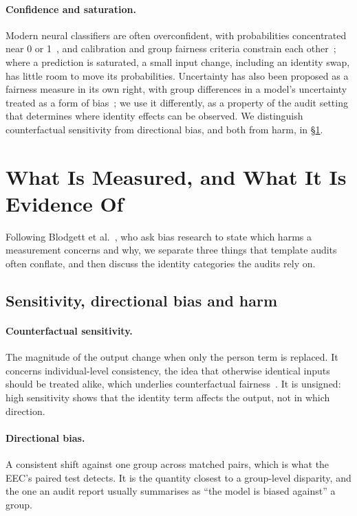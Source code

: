 \documentclass[runningheads]{llncs}
\begin{document}
\paragraph{Confidence and saturation.}
Modern neural classifiers are often overconfident, with probabilities
concentrated near 0 or 1~\cite{guo2017}, and calibration and group fairness
criteria constrain each other~\cite{pleiss2017}; where a prediction is saturated, a
small input change, including an identity swap, has little room to move its
probabilities. Uncertainty has also been proposed as a fairness measure in its
own right, with group differences in a model's uncertainty treated as a form of
bias~\cite{kuzucu2024}; we use it differently, as a property of the audit
setting that determines where identity effects can be observed. We
distinguish counterfactual sensitivity from directional bias, and both from
harm, in \S\ref{sec:construct}.

\section{What Is Measured, and What It Is Evidence Of}\label{sec:construct}
Following Blodgett et al.~\cite{blodgett2020}, who ask bias research to state which harms a
measurement concerns and why, we separate three things that template audits
often conflate, and then discuss the identity categories the audits rely on.

\subsection{Sensitivity, directional bias and harm}
\paragraph{Counterfactual sensitivity.} The magnitude of the output change when
only the person term is replaced. It concerns individual-level consistency, the
idea that otherwise identical inputs should be treated alike, which underlies
counterfactual fairness~\cite{kusner2017}. It is unsigned: high sensitivity shows
that the identity term affects the output, not in which direction.

\paragraph{Directional bias.} A consistent shift against one group across
matched pairs, which is what the EEC's paired test detects. It is the quantity
closest to a group-level disparity, and the one an audit report usually
summarises as ``the model is biased against'' a group.
\end{document}
